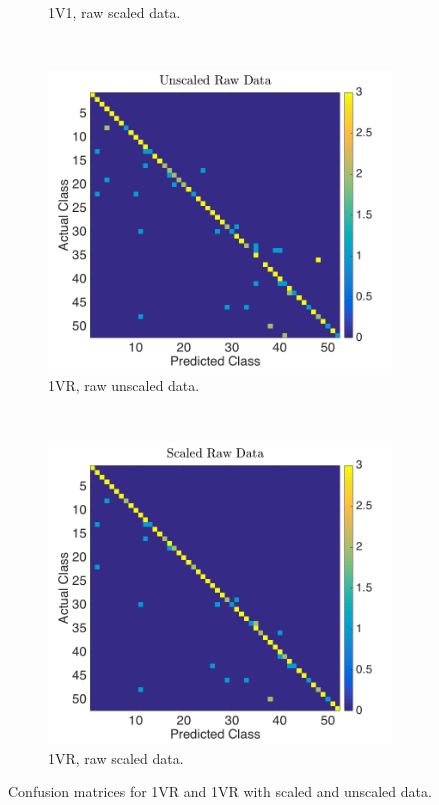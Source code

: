 \documentclass[a4paper, 10pt, conference]{ieeeconf}
\begin{document}
\begin{figure}[!ht]
\begin{subfigure}{0.23\textwidth}
          \caption{1V1, raw scaled data.}
        \end{subfigure}
        \\
        \begin{subfigure}{0.23\textwidth}
          \includegraphics[width=\textwidth]{src/1vr_raw_unscaled.png}
          \caption{1VR, raw unscaled data.}
        \end{subfigure}
        ~
        \begin{subfigure}{0.23\textwidth}
          \includegraphics[width=\textwidth]{src/1vr_raw_scaled.png}
          \caption{1VR, raw scaled data.}
        \end{subfigure}
	\caption{Confusion matrices for 1VR and 1VR with scaled and unscaled data.} \label{fig:svmconfuse}
\end{figure}
\end{document}
